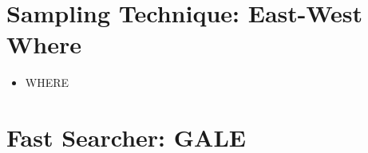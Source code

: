 \documentclass{sig-alternative}
\newcommand{\bi}{\begin{itemize}[leftmargin=0.4cm]}
\newcommand{\ei}{\end{itemize}}
\newcommand{\tab}[1]{Table ~\ref{tab:#1}}
\newcommand{\eq}[1]{Equation~\ref{eq:#1}}
\begin{document}
\section{Sampling Technique: East-West Where}
\bi
    \item{WHERE}
\ei
\section{Fast Searcher: GALE}





 

 
  






\end{document}
